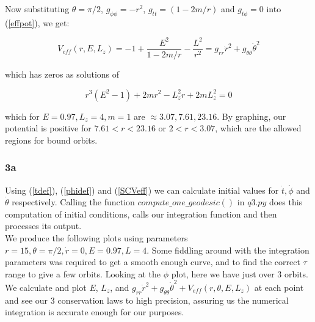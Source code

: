 \documentclass[10pt,a4paper]{report}
\begin{document}
\normalsize
Now substituting $\theta=\pi/2$, $g_{\phi\phi} = -r^2$, $g_{tt}=(1-2m/r)$ and $g_{t\phi} = 0$ into (\ref{effpot}), we get:

\begin{equation}
V_{eff}(r, E, L_z) = -1 + \frac{E^2}{1-2m/r} - \frac{L^2}{r^2} = g_{rr}\dot{r}^2+g_{\theta\theta}\dot{\theta}^2
\label{SCVeff}
\end{equation}

which has zeros as solutions of 

\begin{equation*}
r^3(E^2-1) + 2mr^2 -L_z^2r+2mL_z^2=0
\end{equation*}

which for $E=0.97, L_z=4, m=1$ are $\approx 3.07, 7.61, 23.16$. By graphing, our potential is positive for $7.61<r<23.16$ or $2<r<3.07$, which are the allowed regions for bound orbits.




\subsubsection*{3a}

Using (\ref{tdef}), (\ref{phidef}) and (\ref{SCVeff}) we can calculate initial values for $\dot{t}, \dot{\phi}$ and $\dot{\theta}$ respectively. Calling the function $compute\_one\_geodesic()$ in $q3.py$ does this computation of initial conditions, calls our integration function and then processes its output. \\

We produce the following plots using parameters $r=15, \theta=\pi/2, \dot{r}=0, E=0.97, L=4$. Some fiddling around with the integration parameters was required to get a smooth enough curve, and to find the correct $\tau$ range to give a few orbits. Looking at the $\phi$ plot, here we have just over 3 orbits. We calculate and plot $E$, $L_z$, and $g_{rr}\dot{r}^2+g_{\theta\theta}\dot{\theta}^2 + V_{eff}(r, \theta, E, L_z)$ at each point and see our 3 conservation laws to high precision, assuring us the numerical integration is accurate enough for our purposes.
\end{document}
